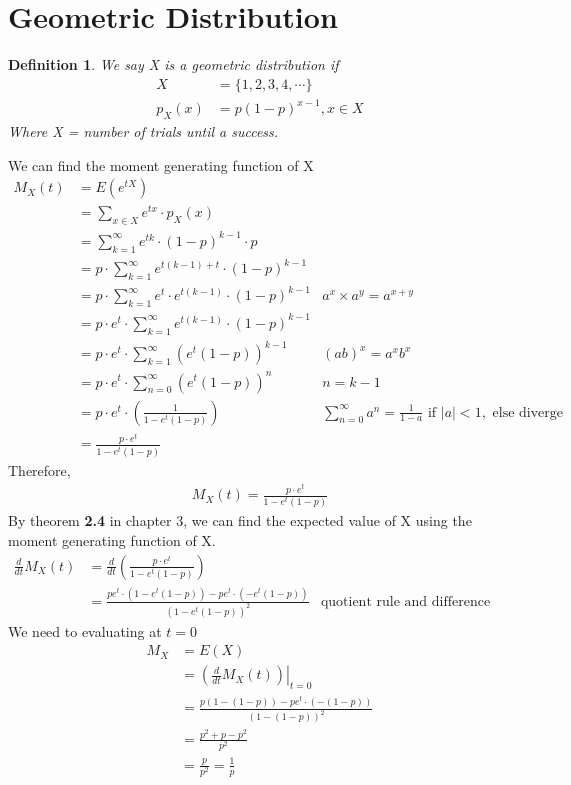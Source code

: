\documentclass[11pt,oneside]{book}
\theoremstyle{break}
\theoremstyle{break}
\newtheorem{defn}{Definition}[corL]
\begin{document}
\section{Geometric Distribution}
\begin{defn}
We say X is a geometric distribution if \begin{align*}
X&=\{1,2,3,4,\cdots\}\\
p_X(x)&=p(1-p)^{x-1},x\in X
\end{align*}
Where X = number of trials until a success.
\end{defn}
We can find the moment generating function of X \\
\begin{align*}
M_X(t)&=E(e^{tX})\\
&=\sum_{x\in X} e^{tx}\cdot p_X(x)\\
&=\sum_{k=1}^{\infty}e^{tk}\cdot (1-p)^{k-1}\cdot p\\
&=p\cdot \sum_{k=1}^{\infty}e^{t(k-1)+t}\cdot (1-p)^{k-1}\\
&=p\cdot \sum_{k=1}^{\infty}e^{t}\cdot e^{t(k-1)}\cdot (1-p)^{k-1}& a^x\times a^y=a^{x+y}\\
&=p\cdot  e^{t}\cdot \sum_{k=1}^{\infty} e^{t(k-1)}\cdot (1-p)^{k-1}\\
&=p\cdot  e^{t}\cdot \sum_{k=1}^{\infty} (e^t(1-p))^{k-1} & (ab)^x=a^xb^x\\
&=p\cdot  e^{t}\cdot \sum_{n=0}^{\infty} (e^t(1-p))^{n} & n=k-1\\
&= p\cdot  e^{t}\cdot \left( \frac{1}{1-e^t(1-p)}\right) & \sum_{n=0}^{\infty} a^n =\frac{1}{1-a} \text{ if }|a|<1, \text{ else diverge}\\
&= \frac{ p\cdot  e^{t}}{1-e^t(1-p)} 
\end{align*} 
Therefore,
\begin{align*}
M_X(t)=\frac{ p\cdot  e^{t}}{1-e^t(1-p)} 
\end{align*}
By theorem \textbf{2.4} in chapter 3, we can find the expected value of X using the moment generating function of X. \begin{align*}
\frac{d}{dt}M_X(t)&=\frac{d}{dt}\left( \frac{ p\cdot  e^{t}}{1-e^t(1-p)}  \right)\\
&=\frac{ pe^{t}\cdot (1-e^t(1-p))-pe^t\cdot (-e^t(1-p))}{(1-e^t(1-p))^2} & \text{quotient rule and difference rule}
\end{align*}
We need to evaluating at $t=0$ \begin{align*}
M_X&=E(X)\\
&=\left. \left(\frac{d}{dt}M_X(t)\right) \right|_{t=0}\\
&=\frac{ p (1-(1-p))-pe^t\cdot (-(1-p))}{(1-(1-p))^2}\\
&=\frac{p^2+p-p^2}{p^2}\\
&=\frac{p}{p^2}=\frac{1}{p}
\end{align*}
\end{document}
